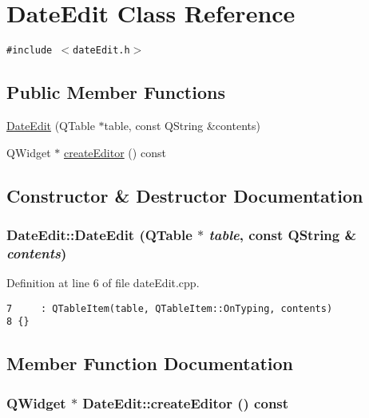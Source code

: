 \hypertarget{classDateEdit}{
\section{Date\-Edit Class Reference}
\label{classDateEdit}
}
{\tt \#include $<$date\-Edit.h$>$}

\subsection*{Public Member Functions}
\begin{CompactItemize}
\item 
\hyperlink{classDateEdit_a0}{Date\-Edit} (QTable $\ast$table, const QString \&contents)
\item 
QWidget $\ast$ \hyperlink{classDateEdit_a1}{create\-Editor} () const
\end{CompactItemize}


\subsection{Constructor \& Destructor Documentation}
\hypertarget{classDateEdit_a0}{
\subsubsection[DateEdit]{\setlength{\rightskip}{0pt plus 5cm}Date\-Edit::Date\-Edit (QTable $\ast$ {\em table}, const QString \& {\em contents})}}
\label{classDateEdit_a0}


Definition at line 6 of file date\-Edit.cpp.

\footnotesize\begin{verbatim}7     : QTableItem(table, QTableItem::OnTyping, contents)
8 {}
\end{verbatim}\normalsize 




\subsection{Member Function Documentation}
\hypertarget{classDateEdit_a1}{
\subsubsection[createEditor]{\setlength{\rightskip}{0pt plus 5cm}QWidget $\ast$ Date\-Edit::create\-Editor () const}}
\label{classDateEdit_a1}


